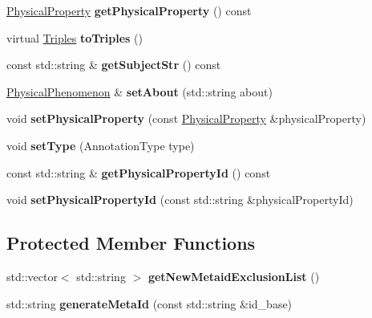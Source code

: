 \begin{DoxyCompactItemize}
\hyperlink{classomexmeta_1_1PhysicalProperty}{Physical\+Property} {\bfseries get\+Physical\+Property} () const
\item 
\mbox{\label{classomexmeta_1_1PhysicalPhenomenon_a30617e685bd8b155a76d38ab5a9db273}} 
virtual \hyperlink{classomexmeta_1_1Triples}{Triples} {\bfseries to\+Triples} ()
\item 
\mbox{\label{classomexmeta_1_1PhysicalPhenomenon_ae99e667cbceff2da0c4c0f5c64a8ba8f}} 
const std\+::string \& {\bfseries get\+Subject\+Str} () const
\item 
\mbox{\label{classomexmeta_1_1PhysicalPhenomenon_a0a9c54b0c4bfad62b618766474dc70f8}} 
\hyperlink{classomexmeta_1_1PhysicalPhenomenon}{Physical\+Phenomenon} \& {\bfseries set\+About} (std\+::string about)
\item 
\mbox{\label{classomexmeta_1_1PhysicalPhenomenon_afad41dbf096b22ab9b64441cb25e9db9}} 
void {\bfseries set\+Physical\+Property} (const \hyperlink{classomexmeta_1_1PhysicalProperty}{Physical\+Property} \&physical\+Property)
\item 
\mbox{\label{classomexmeta_1_1PhysicalPhenomenon_a4c27a0b0e430df95b3cffaf268973eec}} 
void {\bfseries set\+Type} (Annotation\+Type type)
\item 
\mbox{\label{classomexmeta_1_1PhysicalPhenomenon_aca53e0f8ce8139a919f48372b254a5d0}} 
const std\+::string \& {\bfseries get\+Physical\+Property\+Id} () const
\item 
\mbox{\label{classomexmeta_1_1PhysicalPhenomenon_a715b76003eba8e5808fe44a768199fab}} 
void {\bfseries set\+Physical\+Property\+Id} (const std\+::string \&physical\+Property\+Id)
\end{DoxyCompactItemize}
\subsection*{Protected Member Functions}
\begin{DoxyCompactItemize}
\item 
\mbox{\label{classomexmeta_1_1PhysicalPhenomenon_a54d90cf6db78e98bd091f478dc5bd74a}} 
std\+::vector$<$ std\+::string $>$ {\bfseries get\+New\+Metaid\+Exclusion\+List} ()
\item 
\mbox{\label{classomexmeta_1_1PhysicalPhenomenon_afe71a5c6399b992922eb6eeda6de49bd}} 
std\+::string {\bfseries generate\+Meta\+Id} (const std\+::string \&id\+\_\+base)
\end{DoxyCompactItemize}
